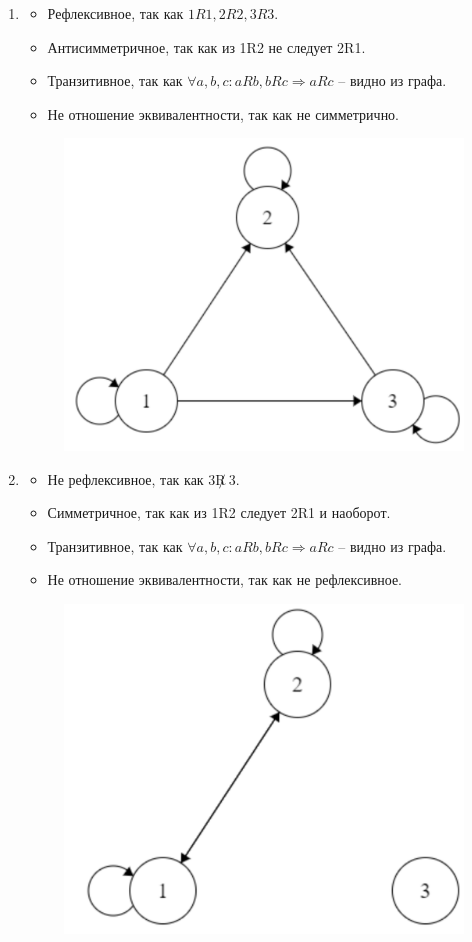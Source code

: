 \documentclass[12pt]{article}
\begin{document}
\begin{enumerate}[label={\textbf{\arabic{section}.\arabic*}}]
		\begin{enumerate}[label=\textbf{\alph*)}]
			\item 
			\begin{itemize}
				\item Рефлексивное, так как $1R1, 2R2, 3R3$.
				\item Антисимметричное, так как из 1R2 не следует 2R1.
				\item Транзитивное, так как $\forall a,b,c: aRb, bRc \Rightarrow  aRc$ -- видно из графа.
				\item Не отношение эквивалентности, так как не симметрично.
			\end{itemize}
			\begin{figure}[h!]
				\centering
				\includegraphics[width=0.4\linewidth]{Снимок экрана_20221123_174931.png}
			\end{figure}
			\item 
			\begin{itemize}
				\item Не рефлексивное, так как $3\not R \ 3$.
				\item Симметричное, так как из 1R2 следует 2R1 и наоборот.
				\item Транзитивное, так как $\forall a,b,c: aRb, bRc \Rightarrow  aRc$ -- видно из графа.
				\item Не отношение эквивалентности, так как не рефлексивное.	
			\end{itemize}
			\begin{figure}[h!]
				\centering
				\includegraphics[width=0.4\linewidth]{Снимок экрана_20221123_175026.png}
			\end{figure}
		\end{enumerate}
		

\end{enumerate}
\end{document}
